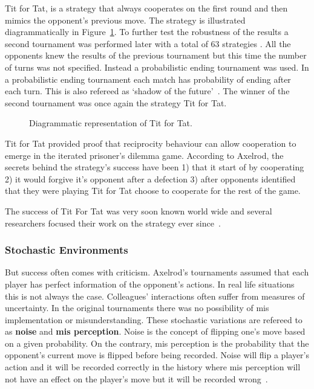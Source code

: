 \documentclass{article}
\begin{document}
Tit for Tat, is a strategy that always cooperates on the first round and then
mimics the opponent's previous move. The strategy is illustrated diagrammatically
in Figure~\ref{fig:tit_for_tat_diagram}. To further test the robustness of the
results a second tournament was performed later with a total of 63 strategies
\cite{axelrod1980b}. All the opponents knew the results of the previous
tournament but this time the number of turns was not specified. Instead
a probabilistic ending tournament was used. In a probabilistic ending tournament
each match has probability of ending after each turn. This is also refereed as
`shadow of the future'~\cite{axelrod1988}. The winner of the second tournament
was once again the strategy Tit for Tat.

\begin{figure}[!hbtp]
    \centering
    
    \caption{Diagrammatic representation of Tit for Tat.}
    \label{fig:tit_for_tat_diagram}
\end{figure}

Tit for Tat provided proof that reciprocity behaviour can allow cooperation
to emerge in the iterated prisoner's dilemma game. According to Axelrod, the
secrets behind the strategy's success have been 1) that it start of by cooperating
2) it would forgive it's opponent after a defection 3) after opponents identified
that they were playing Tit for Tat choose to cooperate for the rest of the game.

The success of Tit For Tat was very soon known world wide and several researchers
focused their work on the strategy ever since~\cite{Douglas2011, Krama2012, Milinski1987}.

\subsubsection{Stochastic Environments}

But success often comes with criticism. Axelrod's tournaments assumed that
each player has perfect information of the opponent's actions. In real life
situations this is not always the case. Colleagues' interactions often suffer from
measures of uncertainty. In the original tournaments there was no possibility of
mis implementation or misunderstanding. These stochastic variations are refereed
to as \textbf{noise} and \textbf{mis perception}. Noise is the concept of flipping
one's move based on a given probability. On the contrary, mis perception is the
probability that the opponent's current move is flipped before being recorded.
Noise will flip a player's action  and it will be recorded correctly in the history
where mis perception will not have an effect on the player's move but it will be
recorded wrong~\cite{Hoffmann1998}.
\end{document}

